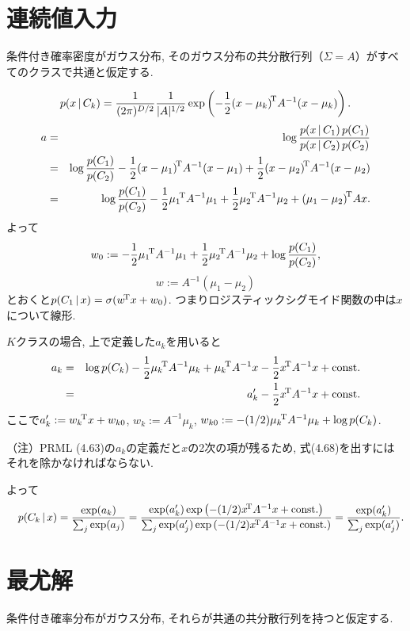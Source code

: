 \section{連続値入力}
条件付き確率密度がガウス分布, そのガウス分布の共分散行列（$\Sigma=A$）がすべてのクラスで共通と仮定する.

$$
p(x\,|\,C_k)=\frac{1}{(2\pi)^{D/2}}\frac{1}{|A|^{1/2}}\exp\left(-\frac{1}{2}{(x-\mu_k)}^{\!\mathrm{T}}A^{-1}(x-\mu_k)\right).
$$
\begin{eqnarray*}
a&=& \log \frac{p(x\,|\,C_1)\,p(C_1)}{p(x\,|\,C_2)\,p(C_2)}\\
 &=& \log \frac{p(C_1)}{p(C_2)}-\frac{1}{2}{(x-\mu_1)}^{\!\mathrm{T}}A^{-1}(x-\mu_1)+\frac{1}{2}{(x-\mu_2)}^{\!\mathrm{T}}A^{-1}(x-\mu_2)\\
 &=& \log \frac{p(C_1)}{p(C_2)}-\frac{1}{2}{\mu_1}^{\!\mathrm{T}} A^{-1} {\mu_1}+\frac{1}{2}{\mu_2}^{\!\mathrm{T}} A^{-1} {\mu_2}+{(\mu_1-\mu_2)}^{\!\mathrm{T}}Ax.
\end{eqnarray*}
よって
$$
w_0:=-\frac{1}{2}{\mu_1}^{\!\mathrm{T}} A^{-1} {\mu_1}+\frac{1}{2}{\mu_2}^{\!\mathrm{T}} A^{-1} {\mu_2}+\log \frac{p(C_1)}{p(C_2)},
$$
$$
w:=A^{-1}(\mu_1-\mu_2)
$$
とおくと$p(C_1\,|\,x)=\sigma({w}^{\!\mathrm{T}}x+w_0)$. つまりロジスティックシグモイド関数の中は$x$について線形.

$K$クラスの場合, 上で定義した$a_k$を用いると
\begin{eqnarray*}
a_k
 &=&\log p(C_k)-\frac{1}{2}{\mu_k}^{\!\mathrm{T}} A^{-1} {\mu_k}+{\mu_k}^{\!\mathrm{T}}A^{-1}x-\frac{1}{2}{x}^{\!\mathrm{T}}A^{-1}x+\text{const.}\\
 &=& a_k'-\frac{1}{2}{x}^{\!\mathrm{T}}A^{-1}x+\text{const.}
\end{eqnarray*}
ここで$a_k':={w_k}^{\!\mathrm{T}}x+w_{k0}$, $w_k:=A^{-1}\mu_k$, $w_{k0}:=-(1/2){\mu_k}^{\!\mathrm{T}} A^{-1} {\mu_k}+\log p(C_k)$.

（注）PRML (4.63)の$a_k$の定義だと$x$の2次の項が残るため, 式(4.68)を出すにはそれを除かなければならない.

よって
\begin{eqnarray*}&&
p(C_k\,|\,x)
=\frac{\exp(a_k)}{\sum_j \exp(a_j)}
=\frac{\exp(a_k')\exp\left(-(1/2){x}^{\!\mathrm{T}} A^{-1} {x}+\text{const.}\right)}{\sum_j \exp(a_j')\exp\left(-(1/2){x}^{\!\mathrm{T}} A^{-1} {x}+\text{const.}\right)}
=\frac{\exp(a_k')}{\sum_j \exp(a_j')}.
\end{eqnarray*}
\vspace{0pt}

\section{最尤解}
条件付き確率分布がガウス分布, それらが共通の共分散行列を持つと仮定する.

